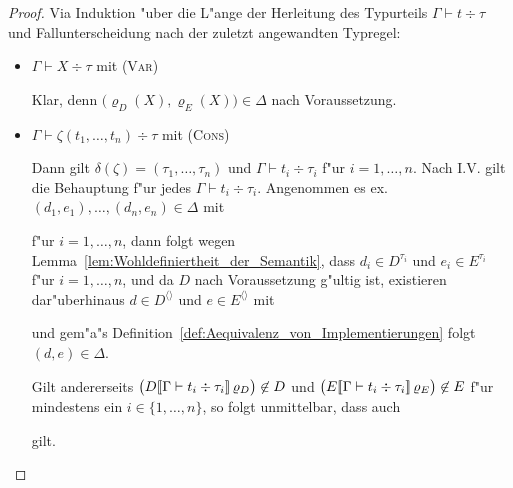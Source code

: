 \documentclass[%
  12pt,%
  a4paper,%
]{article}
\newcommand{\Tj}[3]{{#1}\vdash{#2}\div{#3}}
\begin{document}
\begin{proof}
  Via Induktion "uber die L"ange der Herleitung des Typurteils $\Tj{\Gamma}{t}{\tau}$ und Fallunterscheidung
  nach der zuletzt angewandten Typregel:
  \begin{itemize}
  \item $\Tj{\Gamma}{X}{\tau}$ mit \textsc{(Var)}

    Klar, denn $\bigl(\varrho_D(X), \varrho_E(X)\bigr) \in \Delta$ nach Voraussetzung.

  \item $\Tj{\Gamma}{\zeta(t_1,\ldots,t_n)}{\tau}$ mit \textsc{(Cons)}

    Dann gilt $\delta(\zeta) = (\tau_1,\ldots,\tau_n)$ und $\Tj{\Gamma}{t_i}{\tau_i}$ 
    f"ur $i=1,\ldots,n$. Nach I.V. gilt die Behauptung f"ur jedes $\Tj{\Gamma}{t_i}{\tau_i}$.
    Angenommen es ex. $(d_1,e_1),\ldots,(d_n,e_n) \in \Delta$ mit
    f"ur $i=1,\ldots,n$, dann folgt wegen Lemma~\ref{lem:Wohldefiniertheit_der_Semantik}, dass
    $d_i \in D^{\tau_i}$ und $e_i \in E^{\tau_i}$
    f"ur $i=1,\ldots,n$, und da $D$ nach Voraussetzung g"ultig ist, existieren dar"uberhinaus
    $d \in D^{\langle \rangle}$ und $e \in E^{\langle \rangle}$ mit
    und gem"a"s Definition~\ref{def:Aequivalenz_von_Implementierungen} folgt $(d,e) \in \Delta$.

    Gilt andererseits
    $\bigl(D\sem{\Tj{\Gamma}{t_i}{\tau_i}}\,\varrho_D\bigr) \not\in D$
    und
    $\bigl(E\sem{\Tj{\Gamma}{t_i}{\tau_i}}\,\varrho_E\bigr) \not\in E$
    f"ur mindestens ein $i \in \{1,\ldots,n\}$, so folgt unmittelbar, dass auch
    gilt.


\end{itemize}
\end{proof}
\end{document}
